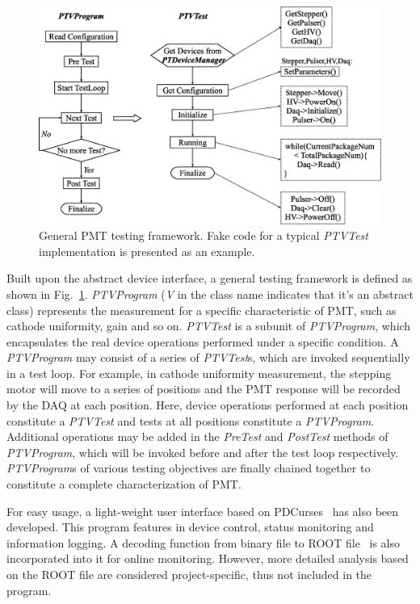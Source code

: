 \documentclass{nst}
\begin{document}
\begin{figure}[!htb]
	\centering
	\includegraphics[width=120mm]{FIG6}
	\caption{General PMT testing framework. Fake code for a typical \textit{PTVTest} implementation is presented as an example.}
	\label{fig:FIG6}
\end{figure}

Built upon the abstract device interface, a general testing framework is defined as shown in Fig.~\ref{fig:FIG6}.
\textit{PTVProgram} (\textit{V} in the class name indicates that it's an abstract class) represents the measurement for a specific characteristic of PMT, such as cathode uniformity, gain and so on.
\textit{PTVTest} is a subunit of \textit{PTVProgram}, which encapsulates the real device operations performed under a specific condition.
A \textit{PTVProgram} may consist of a series of \textit{PTVTest}s, which are invoked sequentially in a test loop.
For example, in cathode uniformity measurement, the stepping motor will move to a series of positions and the PMT response will be recorded by the DAQ at each position.
Here, device operations performed at each position constitute a \textit{PTVTest} and tests at all positions constitute a \textit{PTVProgram}.
Additional operations may be added in the \textit{PreTest} and \textit{PostTest} methods of \textit{PTVProgram}, which will be invoked before and after the test loop respectively.
\textit{PTVProgram}s of various testing objectives are finally chained together to constitute a complete characterization of PMT.

For easy usage, a light-weight user interface based on PDCurses~\cite{pdcurses} has also been developed.
This program features in device control, status monitoring and information logging.
A decoding function from binary file to ROOT file~\cite{root} is also incorporated into it for online monitoring.
However, more detailed analysis based on the ROOT file are considered project-specific, thus not included in the program. 
\end{document}
